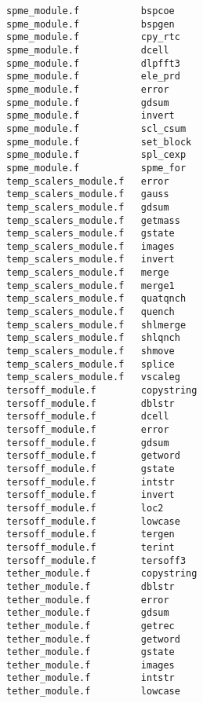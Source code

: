 \begin{verbatim}
spme_module.f           bspcoe                    
spme_module.f           bspgen                    
spme_module.f           cpy_rtc                   
spme_module.f           dcell                     
spme_module.f           dlpfft3                   
spme_module.f           ele_prd                   
spme_module.f           error                     
spme_module.f           gdsum                     
spme_module.f           invert                    
spme_module.f           scl_csum              
spme_module.f           set_block
spme_module.f           spl_cexp 
spme_module.f           spme_for
temp_scalers_module.f   error                     
temp_scalers_module.f   gauss                     
temp_scalers_module.f   gdsum                     
temp_scalers_module.f   getmass                   
temp_scalers_module.f   gstate                    
temp_scalers_module.f   images                    
temp_scalers_module.f   invert                    
temp_scalers_module.f   merge                     
temp_scalers_module.f   merge1                    
temp_scalers_module.f   quatqnch                  
temp_scalers_module.f   quench                    
temp_scalers_module.f   shlmerge                  
temp_scalers_module.f   shlqnch                   
temp_scalers_module.f   shmove                    
temp_scalers_module.f   splice                    
temp_scalers_module.f   vscaleg                   
tersoff_module.f        copystring                
tersoff_module.f        dblstr                    
tersoff_module.f        dcell                     
tersoff_module.f        error                     
tersoff_module.f        gdsum                     
tersoff_module.f        getword                   
tersoff_module.f        gstate                    
tersoff_module.f        intstr                    
tersoff_module.f        invert                    
tersoff_module.f        loc2                      
tersoff_module.f        lowcase                   
tersoff_module.f        tergen                    
tersoff_module.f        terint                    
tersoff_module.f        tersoff3                  
tether_module.f         copystring                
tether_module.f         dblstr                    
tether_module.f         error                     
tether_module.f         gdsum                     
tether_module.f         getrec                    
tether_module.f         getword                   
tether_module.f         gstate                    
tether_module.f         images                    
tether_module.f         intstr                    
tether_module.f         lowcase                   

\end{verbatim}
